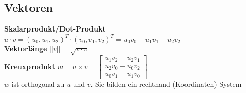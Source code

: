 \documentclass[12pt]{article}
\begin{document}
	\subsection{Vektoren}
	\textbf{Skalarprodukt/Dot-Produkt} $u \cdot v = (u_0, u_1, u_2)^T \cdot (v_0, v_1, v_2)^T = u_0 v_0 + u_1 v_1 + u_2 v_2$\\
	\textbf{Vektorlänge} $||v|| = \sqrt{v \cdot v}$\\
	\textbf{Kreuxprodukt} $w = u \times v = 
		\begin{bmatrix}
			u_1 v_2 - u_2 v_1\\
			u_2 v_0 - u_0 v_2\\
			u_0 v_1 - u_1 v_0
		\end{bmatrix}$\\
	$w$ ist orthogonal zu $u$ und $v$. Sie bilden ein rechthand-(Koordinaten)-System
\end{document}
